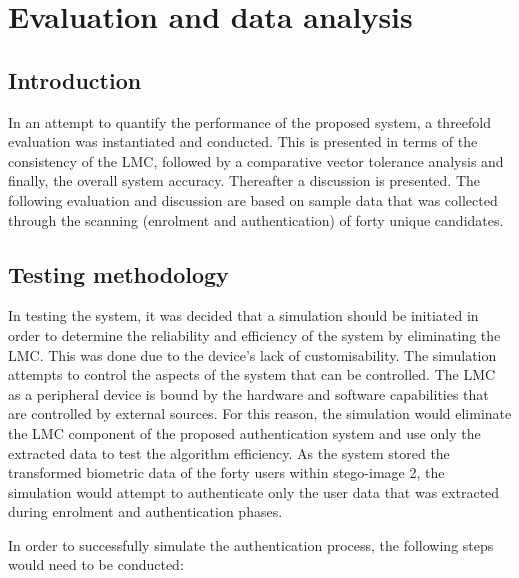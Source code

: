 \chapter{Evaluation and data analysis}


\section{Introduction}

In an attempt to quantify the performance of the proposed system, a threefold evaluation was instantiated and conducted. This is presented in terms of the consistency of the LMC, followed by a comparative vector tolerance analysis and finally, the overall system accuracy. Thereafter a discussion is presented. The following evaluation and discussion are based on sample data that was collected through the scanning (enrolment and authentication) of forty unique candidates.

\section{Testing methodology}


In testing the system, it was decided that a simulation should be initiated in order to determine the reliability and efficiency of the system by eliminating the LMC. This was done due to the device's lack of customisability. 
The simulation attempts to control the aspects of the system that can be controlled. The LMC as a peripheral device is bound by the hardware and software capabilities that are controlled by external sources. For this reason, the simulation would eliminate the LMC component of the proposed authentication system and use only the extracted data to test the algorithm efficiency. As the system stored the transformed biometric data of the forty users within stego-image 2, the simulation would attempt to authenticate only the user data that was extracted during enrolment and authentication phases. 

In order to successfully simulate the authentication process, the following steps would need to be conducted: 

